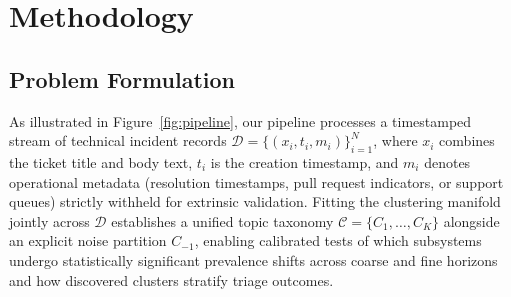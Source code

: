 \documentclass[sigconf,anonymous,pbalance]{acmart}
\begin{document}
\section{Methodology}
\label{sec:method}

\subsection{Problem Formulation}
As illustrated in Figure~\ref{fig:pipeline}, our pipeline processes a timestamped stream of technical incident records $\mathcal{D} = \{(x_i, t_i, m_i)\}_{i=1}^{N}$, where $x_i$ combines the ticket title and body text, $t_i$ is the creation timestamp, and $m_i$ denotes operational metadata (resolution timestamps, pull request indicators, or support queues) strictly withheld for extrinsic validation. Fitting the clustering manifold jointly across $\mathcal{D}$ establishes a unified topic taxonomy $\mathcal{C} = \{C_1, \dots, C_K\}$ alongside an explicit noise partition $C_{-1}$, enabling calibrated tests of which subsystems undergo statistically significant prevalence shifts across coarse and fine horizons and how discovered clusters stratify triage outcomes.
\end{document}
